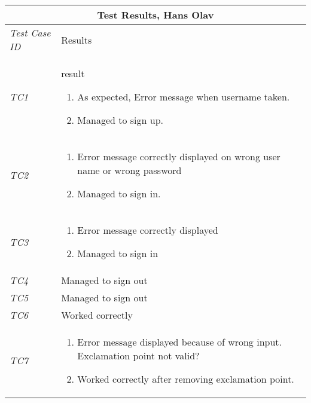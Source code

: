 \begin{minipage}{\linewidth}
\setlength{\tabcolsep}{15pt}
\centering
{}
\begin{tabular}{ |l|p{70mm}| }
	\hline
	\multicolumn{2}{|c|}{\cellcolor{gray!25} \textbf{Test Results, Hans Olav}} \\
	\hline
	\it{\cellcolor{gray!25}Test Case ID} & {\cellcolor{gray!25} Results } \\
	\hline
	\it{\cellcolor{gray!25}TC1} & result \begin{enumerate}[label=\alph*)]
	                                       \item As expected, Error message when username taken.
	                                       \item Managed to sign up.
	                                     \end{enumerate}\\ \hline
	\it{\cellcolor{gray!25}TC2} & \begin{enumerate}[label=\alph*)]
	                                \item Error message correctly displayed on wrong user name or wrong password
	                                \item Managed to sign in.
	                              \end{enumerate}\\ \hline
	\it{\cellcolor{gray!25}TC3} & \begin{enumerate}[label=\alph*)]
	                                \item Error message correctly displayed
                                    \item Managed to sign in
                                    \end{enumerate}\\ \hline
	\it{\cellcolor{gray!25}TC4} & Managed to sign out \\ \hline
	\it{\cellcolor{gray!25}TC5} & Managed to sign out \\ \hline
	\it{\cellcolor{gray!25}TC6} & Worked correctly \\ \hline
	\it{\cellcolor{gray!25}TC7} & \begin{enumerate}[label=\alph*)]
	                                \item Error message displayed because of wrong input. Exclamation point not valid?
	                                \item Worked correctly after removing exclamation point.

\end{enumerate}
\end{tabular}
\end{minipage}
